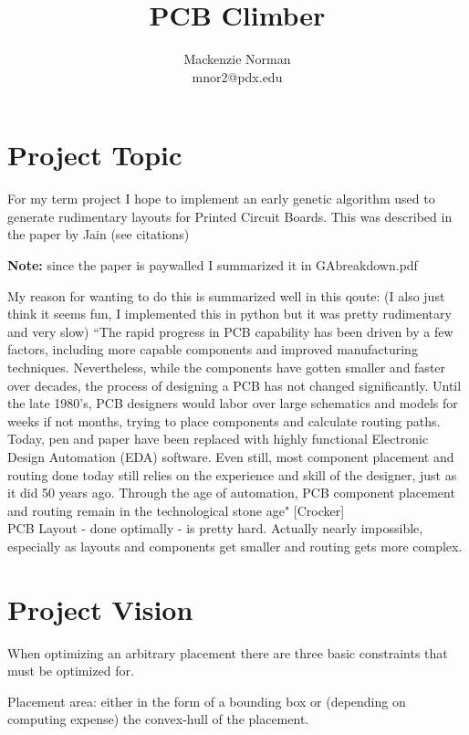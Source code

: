 \documentclass{article}
\title{PCB Climber}
\author{Mackenzie Norman\\ mnor2@pdx.edu}
\begin{document}
\maketitle
\section{Project Topic}
For my term project I hope to implement an early genetic algorithm used to generate rudimentary layouts for Printed Circuit Boards. This was described in the paper by Jain (see citations)  

\textbf{Note:} since the paper is paywalled I summarized it in GA\textunderscore breakdown.pdf

My reason for wanting to do this is summarized well in this qoute: (I also just think it seems fun, I implemented this in python but it was pretty rudimentary and very slow)
``The rapid progress in PCB capability has been driven by a few factors, including more capable components and improved manufacturing techniques. Nevertheless, while the components have gotten smaller and faster over decades, the process of designing a PCB has not changed significantly. Until the late 1980’s, PCB designers would labor over large schematics and models for weeks if not months, trying to place components and calculate routing paths. Today, pen and paper have been replaced with highly functional Electronic Design Automation (EDA) software. Even still, most component placement and routing done today still relies on the experience and skill of the designer, just as it did 50 years ago. Through the age of automation, PCB component placement and routing remain in the technological stone age" [Crocker]\\

PCB Layout - done optimally - is pretty hard. Actually nearly impossible, especially as layouts and components get smaller and routing gets more complex.  \\



\section{Project Vision}

When optimizing an arbitrary placement there are three basic constraints that must be optimized for.

Placement area: either in the form of a bounding box or (depending on computing expense) the convex-hull of the placement. 
\end{document}
